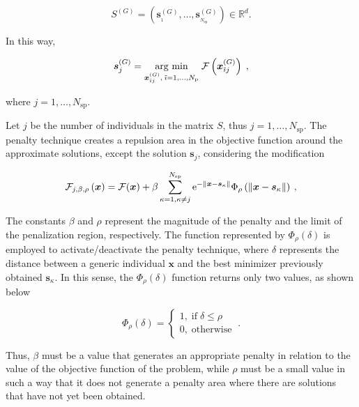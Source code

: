 \documentclass[smallextended]{svjour3}       %
\begin{document}
\begin{equation}
 S^{(G)} = (\boldsymbol{s}_{ _{1}} ^{(G)}, \dots, \boldsymbol{s}_{ _{N_{\text{sp}}}} ^{(G)}) \in \mathbb{R}^{d}.
\end{equation}

In this way,

\begin{equation}
\boldsymbol{s}_{j} ^{(G)}= \underset{\boldsymbol{x}^{(G)} _{\tilde{\imath}j}, \: \tilde{\imath} = 1, \dots, N_{\text{p}}}{\text{arg min}} \; {\cal{F}}\left(\boldsymbol{x}_{\tilde{\imath}j}^{\left(G\right)}\right) \; ,
\label{eq:formulacao_S}
\end{equation}

\noindent where $j = 1, \dots, N_{\text{sp}}$.

Let $j$ be the number of individuals in the matrix $S$, thus $j = 1, \dots, N_{\text{sp}}$. The penalty technique creates a repulsion area in the objective function around the approximate solutions, except the solution $\boldsymbol{s}_{j}$, considering the modification

\begin{equation} \label{eq:funcao_penalizacao}
{\cal{F}}_{j, \beta, \rho}\left(\boldsymbol{x}\right) = {\cal{F}}(\boldsymbol{x}) + \beta\sum\limits_{\kappa=1, \kappa\neq j}^{N_{\text{sp}}}\text{e}^{-\Vert \boldsymbol{x} - \boldsymbol{s}_{\kappa} \Vert}\Phi_{\rho}\left(\Vert \boldsymbol{x} - \boldsymbol{s}_{\kappa} \Vert\right) \: ,
\end{equation}

The constants $ \beta $ and $ \rho $ represent the magnitude of the penalty and the limit of the penalization region, respectively. The function represented by $\Phi_{\rho}(\delta)$ is employed to activate/deactivate the penalty technique, where $\delta$ represents the distance between a generic individual $\boldsymbol{x}$ and the best minimizer previously obtained
$\boldsymbol{s}_{\kappa}$. In this sense, the  $ \Phi_{\rho}\left(\delta\right) $ function returns only two values, as shown below

\begin{equation}
\Phi_{\rho}(\delta) = 
\begin{cases}
1, \; \text{if} \; \delta \leq \rho \\
0, \; \text{otherwise}
\end{cases} \: .
\end{equation}

Thus, $ \beta $ must be a value that generates an appropriate penalty in relation to the value of the objective function of the problem, while $ \rho $ must be a small value in such a way that it does not generate a penalty area where there are solutions that have not yet been obtained.
\end{document}
